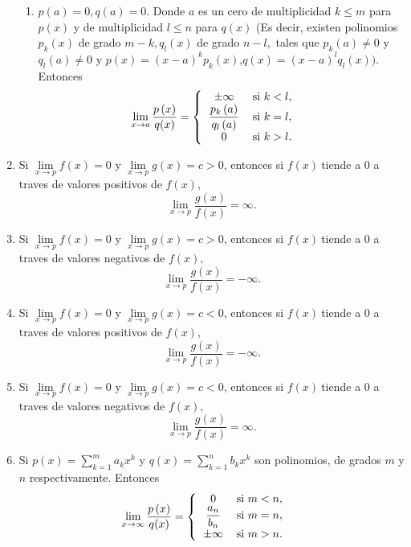 \begin{theorem}
\begin{enumerate}
\begin{enumerate}
\item $p\left(  a\right)  =0,q\left(  a\right)  =0$. Donde $a$ es un cero de
multiplicidad $k\leq m$ para $p\left(  x\right)  $ y de multiplicidad $l\leq
n$ para $q\left(  x\right)  $ (Es decir, existen polinomios $p_{k}\left(
x\right)  $ de grado $m-k,q_{l}\left(  x\right)  $ de grado $n-l,$ tales que
$p_{k}\left(  a\right)  \neq0$ y $q_{l}\left(  a\right)  \neq0$ y $p\left(
x\right)  =\left(  x-a\right)  ^{k}p_{k}\left(  x\right)  $,$q\left(
x\right)  =\left(  x-a\right)  ^{l}q_{l}\left(  x\right)  )$. Entonces
\[
\lim\limits_{x\rightarrow a}\frac{p\left(  x\right)  }{q(x)}=\left\{
\begin{tabular}
[c]{cc}%
$\pm\infty$ & si $k<l,$\\
$\dfrac{p_{k}\left(  a\right)  }{q_{l}\left(  a\right)  }$ & si $k=l,$\\
$0$ & si $k>l.$%
\end{tabular}
\ \ \ \right.
\]

\end{enumerate}

\item Si $\lim\limits_{x\rightarrow p}f(x)=0$ y $\lim\limits_{x\rightarrow
p}g(x)=c>0$, entonces si $f(x)\ $tiende a $0$ a traves de valores positivos de
$f(x),$%
\[
\lim\limits_{x\rightarrow p}\frac{g(x)}{f(x)}=\infty.
\]


\item Si $\lim\limits_{x\rightarrow p}f(x)=0$ y $\lim\limits_{x\rightarrow
p}g(x)=c>0$, entonces si $f(x)\ $tiende a $0$ a traves de valores negativos de
$f(x),$%
\[
\lim\limits_{x\rightarrow p}\frac{g(x)}{f(x)}=-\infty.
\]


\item Si $\lim\limits_{x\rightarrow p}f(x)=0$ y $\lim\limits_{x\rightarrow
p}g(x)=c<0$, entonces si $f(x)\ $tiende a $0$ a traves de valores positivos de
$f(x),$%
\[
\lim\limits_{x\rightarrow p}\frac{g(x)}{f(x)}=-\infty.
\]


\item Si $\lim\limits_{x\rightarrow p}f(x)=0$ y $\lim\limits_{x\rightarrow
p}g(x)=c<0$, entonces si $f(x)\ $tiende a $0$ a traves de valores negativos de
$f(x),$%
\[
\lim\limits_{x\rightarrow p}\frac{g(x)}{f(x)}=\infty.
\]


\item Si $p(x)=\sum\limits_{k=1}^{m}a_{k}x^{k}$ y $q(x)=\sum\limits_{k=1}%
^{n}b_{k}x^{k}$ son polinomios, de grados $m$ y $n$ respectivamente. Entonces%
\[
\lim\limits_{x\rightarrow\infty}\frac{p\left(  x\right)  }{q(x)}=\left\{
\begin{tabular}
[c]{cc}%
$0$ & si $m<n,$\\
$\dfrac{a_{n}}{b_{n}}$ & si $m=n,$\\
$\pm\infty$ & si $m>n.$%
\end{tabular}
\ \ \ \right.
\]

\end{enumerate}
\end{theorem}
